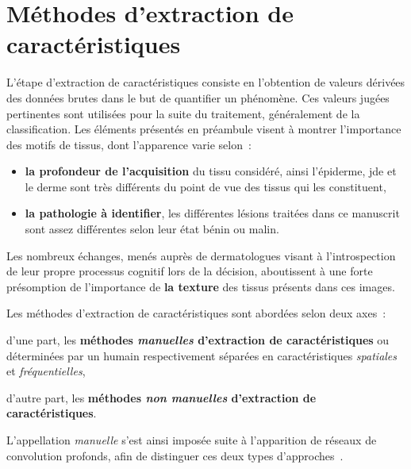 \newpage

\section{Méthodes d'extraction de caractéristiques}
\label{chap:feature_extraction}
L'étape d'extraction de caractéristiques consiste en l'obtention de valeurs dérivées des données brutes dans le but de quantifier un phénomène. Ces valeurs jugées pertinentes sont utilisées pour la suite du traitement, généralement de la classification. Les éléments présentés en préambule visent à montrer l'importance des motifs de tissus, dont l'apparence varie selon~:
\begin{itemize}
    \item \textbf{la profondeur de l'acquisition} du tissu considéré, ainsi l'épiderme, \gls{jde} et le derme sont très différents du point de vue des tissus qui les constituent,
    \item \textbf{la pathologie à identifier}, les différentes lésions traitées dans ce manuscrit sont assez différentes selon leur état bénin ou malin.
\end{itemize}
Les nombreux échanges, menés auprès de dermatologues visant à l'introspection de leur propre processus cognitif lors de la décision, aboutissent à une forte présomption de l'importance de \textbf{la texture} des tissus présents dans ces images.\par

Les méthodes d'extraction de caractéristiques sont abordées selon deux axes~:
\begin{inlinerate}
    \item d'une part, les \textbf{méthodes \textit{manuelles} d'extraction de caractéristiques} ou déterminées par un humain respectivement séparées en caractéristiques \textit{spatiales} et \textit{fréquentielles},
    \item d'autre part, les \textbf{méthodes \textit{non manuelles} d'extraction de caractéristiques}.
\end{inlinerate} 
L'appellation \textit{manuelle} s'est ainsi imposée suite à l'apparition de réseaux de convolution profonds, afin de distinguer ces deux types d'approches~\cite{Nanni2017}.\par

